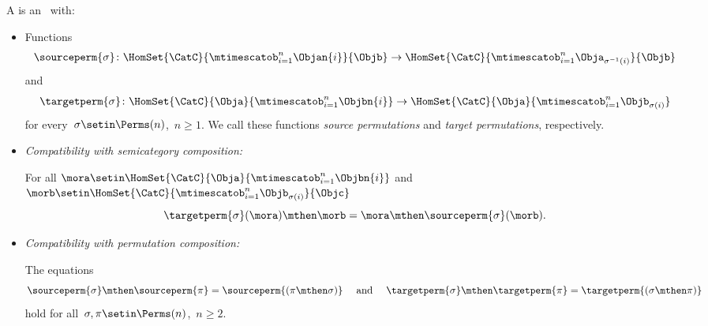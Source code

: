 \begin{ctdefinition}
    \label{def:symmetric-stacking-category}
    A  is an  ~\CatC with:

    \constit

    \begin{itemize}
        \item Functions
              \begin{equation}
                  \sourceperm{\sigma} \colon \HomSet{\CatC}{\mtimescatob_{i=1}^n \Objan{i}}{\Objb} \to \HomSet{\CatC}{\mtimescatob_{i=1}^n \Obja_{\sigma^{-1}(i)}}{\Objb}
              \end{equation}
              and
              \begin{equation}
                  \targetperm{\sigma} \colon \HomSet{\CatC}{\Obja}{\mtimescatob_{i=1}^n \Objbn{i}} \to \HomSet{\CatC}{\Obja}{\mtimescatob_{i=1}^n \Objb_{\sigma(i)}}
              \end{equation}
              for every~$\sigma \setin \Perms(n)$,~$n \geq 1$.
              We call these functions \emph{source permutations} and \emph{target permutations}, respectively.
    \end{itemize}

    \condit

    \begin{itemize}

        \item \emph{Compatibility with semicategory composition:}

              For all $\mora \setin \HomSet{\CatC}{\Obja}{\mtimescatob_{i=1}^n \Objbn{i}}$ and $\morb \setin \HomSet{\CatC}{\mtimescatob_{i=1}^n \Objb_{\sigma(i)}}{\Objc}$
              \begin{equation}
                  \label{eq:perm-compatibility-with-composition}
                  \targetperm{\sigma} (\mora) \mthen \morb = \mora \mthen \sourceperm{\sigma}(\morb).
              \end{equation}
              
               \item \emph{Compatibility with permutation composition:}

              The equations
              \begin{equation}
                  \label{eq:perm-compatibility-with-perm-comp}
                  \sourceperm{\sigma} \mthen \sourceperm{\pi} = \sourceperm{(\pi\mthen\sigma)}
                  \quad \text{ and } \quad
                  \targetperm{\sigma} \mthen \targetperm{\pi} = \targetperm{(\sigma \mthen \pi)}
              \end{equation}
              hold for all~$\sigma, \pi \setin \Perms(n)$,~$n \geq 2$.



\end{itemize}
\end{ctdefinition}
